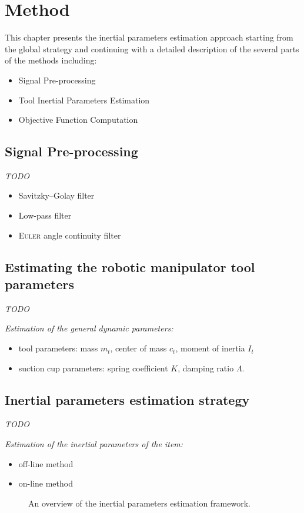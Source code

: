 \documentclass[/home/francois/latex/report/main.tex]{subfiles}
\begin{document}
\chapter{Method}
\label{chapter:method}

This chapter presents the inertial parameters estimation approach starting from the global strategy and continuing with a detailed description of the several parts of the methods including:

\begin{itemize}
  \item Signal Pre-processing
  \item Tool Inertial Parameters Estimation
  \item Objective Function Computation
\end{itemize}

\section{Signal Pre-processing}

\textit{TODO}

{\it
\begin{itemize}
  \item Savitzky–Golay filter
  \item Low-pass filter
  \item \textsc{Euler} angle continuity filter
\end{itemize}
}

\section{Estimating the robotic manipulator tool parameters}

\textit{TODO}

{\it
Estimation of the general dynamic parameters:

\begin{itemize}
  \item tool parameters: mass $m_t$, center of mass $c_t$, moment of inertia $I_t$
  \item suction cup parameters: spring coefficient $K$, damping ratio $\Lambda$.
\end{itemize}
}

\section{Inertial parameters estimation strategy}

\textit{TODO}

{\it
Estimation of the inertial parameters of the item:

\begin{itemize}
  \item off-line method
  \item on-line method
\end{itemize}
}

\begin{figure}[H]
\centering
   \caption{An overview of the inertial parameters estimation framework.}
   \label{fig:tikz:model}
\end{figure}
\end{document}
